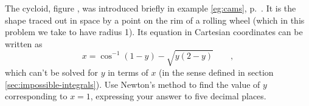 The cycloid, figure , was introduced briefly in example \ref{eg:cams}, p.~\pageref{eg:cams}.
It is the shape traced out in space by a point on the rim of a rolling wheel (which in this
problem we take to have radius 1).
Its equation in Cartesian coordinates can be written as
\begin{equation*}
  x = \cos^{-1}(1-y)-\sqrt{y(2-y)} \qquad ,
\end{equation*}
which can't be solved for $y$ in terms of $x$ (in the sense defined in section \ref{sec:impossible-integrals}).
Use Newton's method to find the value of $y$ corresponding to $x=1$, expressing your answer to five
decimal places.
